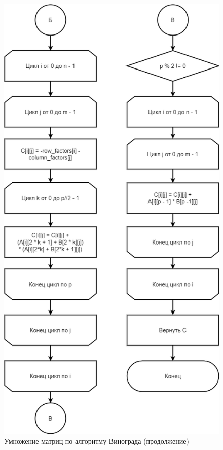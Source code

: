 \begin{figure}[H]
	\begin{center}
		\includegraphics[scale=0.6]{img/winograd2.png}
	\end{center}
	\captionsetup{justification=centering}
	\caption{Умножение матриц по алгоритму Винограда (продолжение)}
	\label{img:winograd2}
\end{figure}

